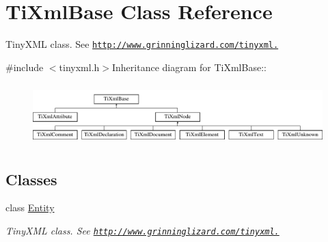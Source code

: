 \hypertarget{class_ti_xml_base}{
\section{TiXmlBase Class Reference}
\label{class_ti_xml_base}
}


TinyXML class. See \href{http://www.grinninglizard.com/tinyxml.}{\tt http://www.grinninglizard.com/tinyxml.}  


{\ttfamily \#include $<$tinyxml.h$>$}Inheritance diagram for TiXmlBase::\begin{figure}[H]
\begin{center}
\leavevmode
\includegraphics[height=2.41379cm]{class_ti_xml_base}
\end{center}
\end{figure}
\subsection*{Classes}
\begin{DoxyCompactItemize}
\item 
class \hyperlink{struct_ti_xml_base_1_1_entity}{Entity}
\begin{DoxyCompactList}\small\item\em TinyXML class. See \href{http://www.grinninglizard.com/tinyxml.}{\tt http://www.grinninglizard.com/tinyxml.} \item\end{DoxyCompactList}\end{DoxyCompactItemize}
